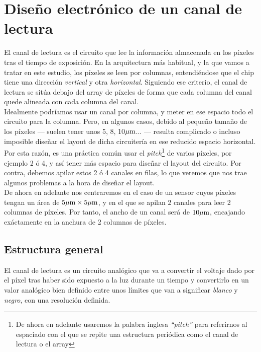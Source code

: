 \chapter{Diseño electrónico de un canal de lectura}\label{cap:ro_sch}

El canal de lectura es el circuito que lee la información almacenada en los píxeles
tras el tiempo de exposición.
En la arquitectura más habitual, y la que vamos a tratar en este estudio, los
píxeles se leen por columnas, entendiéndose que el chip tiene una dirección
\textit{vertical} y otra \textit{horizontal}. Siguiendo ese criterio, el canal de lectura se
sitúa debajo del array de píxeles de forma que cada columna del canal quede alineada
con cada columna del canal.\\

Idealmente podríamos usar un canal por columna, y meter en ese espacio todo el circuito
para la columna. Pero, en algunos casos, debido al pequeño tamaño de los píxeles
--- suelen tener unos 5, 8, 10$\mu\text{m}$... --- resulta complicado o incluso imposible diseñar el
layout de dicha circuitería en ese reducido espacio horizontal.
Por esta razón, es una práctica común usar el \textit{pitch}\footnote{De ahora en adelante
usaremos la palabra inglesa \textit{``pitch''} para referirnos al espaciado con el
que se repite una estructura periódica como el canal de lectura o el array}
de varios píxeles, por
ejemplo 2 ó 4, y así tener más espacio para diseñar el layout del circuito. Por contra,
debemos apilar estos 2 ó 4 canales en filas, lo que veremos que nos trae algunos
problemas a la hora de diseñar el layout.\\

De ahora en adelante nos centraremos en el caso de un sensor cuyos píxeles tengan
un área de $5\mu\text{m} \times 5\mu\text{m}$, y en el que se apilan 2 canales para leer 2
columnas de píxeles. Por tanto, el ancho de un canal será de $10\mu\text{m}$, encajando
exáctamente en la anchura de 2 columnas de píxeles.\\

\section{Estructura general}\label{cap:ro_sch_estructura}

El canal de lectura es un circuito analógico que va a convertir el voltaje
dado por el píxel tras haber sido expuesto a la luz durante un tiempo y
convertirlo en un valor analógico bien definido entre unos límites que van a
significar \textit{blanco} y \textit{negro}, con una resolución definida.\\

